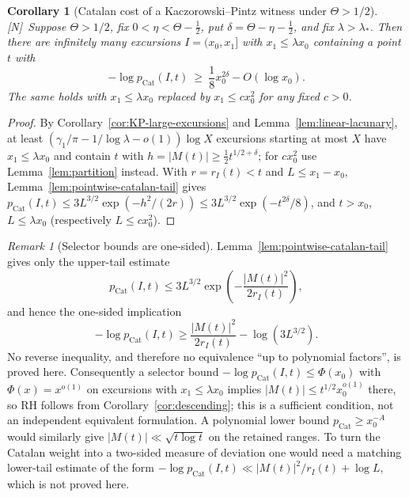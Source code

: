\documentclass[11pt,reqno]{amsart}
\numberwithin{equation}{section}
\theoremstyle{plain}
\newtheorem{corollary}[theorem]{Corollary}
\theoremstyle{definition}
\theoremstyle{remark}
\newtheorem{remark}[theorem]{Remark}
\newcommand{\tagN}{\textup{[N]}}
\begin{document}
\begin{corollary}[Catalan cost of a Kaczorowski--Pintz witness under $\Theta>1/2$]
\label{cor:catalan-surprise}
\tagN\ Suppose $\Theta>1/2$, fix $0<\eta<\Theta-\frac12$, put
$\delta=\Theta-\eta-\frac12$, and fix $\lambda>\lambda_*$. Then there are
infinitely many excursions $I=(x_0,x_1]$ with $x_1\le\lambda x_0$ containing
a point $t$ with
\begin{equation}
\label{eq:KP-catalan-surprise}
-\log p_{\mathrm{Cat}}(I,t)\ \ge\ \frac18x_0^{2\delta}-O(\log x_0).
\end{equation}
The same holds with $x_1\le\lambda x_0$ replaced by $x_1\le cx_0^2$ for any
fixed $c>0$.
\end{corollary}

\begin{proof}
By Corollary~\ref{cor:KP-large-excursions} and Lemma~\ref{lem:linear-lacunary},
at least $(\gamma_1/\pi-1/\log\lambda-o(1))\log X$ excursions starting at
most $X$ have $x_1\le\lambda x_0$ and contain $t$ with
$h=|M(t)|\ge\frac12t^{1/2+\delta}$; for $cx_0^2$ use
Lemma~\ref{lem:partition} instead. With $r=r_I(t)<t$ and $L\le x_1-x_0$,
Lemma~\ref{lem:pointwise-catalan-tail} gives
$p_{\mathrm{Cat}}(I,t)\le3L^{3/2}\exp(-h^2/(2r))\le3L^{3/2}\exp(-t^{2\delta}/8)$,
and $t>x_0$, $L\le\lambda x_0$ (respectively $L\le cx_0^2$).
\end{proof}

\begin{remark}[Selector bounds are one-sided]
\label{rem:catalan-selector-gap}
Lemma~\ref{lem:pointwise-catalan-tail} gives only the upper-tail estimate
\begin{equation}
 p_{\mathrm{Cat}}(I,t)
 \le 3L^{3/2}\exp\!\left(-\frac{|M(t)|^2}{2r_I(t)}\right),
\end{equation}
and hence the one-sided implication
\begin{equation}
 -\log p_{\mathrm{Cat}}(I,t)
 \ge \frac{|M(t)|^2}{2r_I(t)}-\log(3L^{3/2}).
\end{equation}
No reverse inequality, and therefore no equivalence ``up to polynomial
factors'', is proved here.  Consequently a selector bound
$-\log p_{\mathrm{Cat}}(I,t)\le\Phi(x_0)$ with
$\Phi(x)=x^{o(1)}$ on excursions with $x_1\le\lambda x_0$ implies
$|M(t)|\le t^{1/2}x_0^{o(1)}$ there, so RH follows from
Corollary~\ref{cor:descending}; this is a sufficient condition, not an
independent equivalent formulation.  A polynomial lower bound
$p_{\mathrm{Cat}}\ge x_0^{-A}$ would similarly give
$|M(t)|\ll\sqrt{t\log t}$ on the retained ranges.  To turn the Catalan
weight into a two-sided measure of deviation one would need a matching
lower-tail estimate of the form
$-\log p_{\mathrm{Cat}}(I,t)\ll |M(t)|^2/r_I(t)+\log L$, which is not proved
here.
\end{remark}
\end{document}
